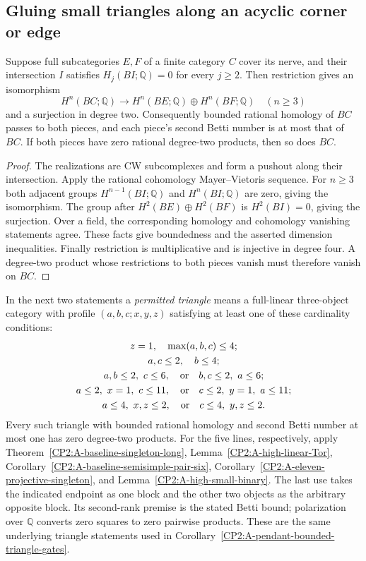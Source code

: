 \subsection{Gluing small triangles along an acyclic corner or edge}

\begin{lemma}
\label{CP2:A-low-homology-gluing}
Suppose full subcategories $E,F$ of a finite category $C$
cover its nerve, and their intersection $I$ satisfies
$H_j(BI;\mathbb Q)=0$ for every $j\geq2$.
Then restriction gives an isomorphism
\[
 H^n(BC;\mathbb Q)\longrightarrow
 H^n(BE;\mathbb Q)\oplus H^n(BF;\mathbb Q)
 \quad(n\geq3)
\]
and a surjection in degree two. Consequently bounded
rational homology of $BC$ passes to both pieces, and
each piece's second Betti number is at most that of $BC$.
If both pieces have zero rational degree-two products,
then so does $BC$.
\end{lemma}
\begin{proof}
The realizations are CW subcomplexes and form a pushout
along their intersection. Apply the rational cohomology
Mayer--Vietoris sequence. For $n\geq3$ both adjacent
groups $H^{n-1}(BI;\mathbb Q)$ and $H^n(BI;\mathbb Q)$
are zero, giving the isomorphism. The group after
$H^2(BE)\oplus H^2(BF)$ is $H^2(BI)=0$, giving the
surjection. Over a field, the corresponding homology
and cohomology vanishing statements agree. These facts
give boundedness and the asserted dimension inequalities.
Finally restriction is multiplicative and is injective
in degree four. A degree-two product whose restrictions
to both pieces vanish must therefore vanish on $BC$.
\end{proof}

In the next two statements a \emph{permitted triangle}
means a full-linear three-object category with profile
$(a,b,c;x,y,z)$ satisfying at least one of these
cardinality conditions:
\[
\begin{gathered}
 z=1,\quad \max(a,b,c)\leq4;\\
 a,c\leq2,\quad b\leq4;\\
 a,b\leq2,\ c\leq6,\quad\hbox{or}\quad b,c\leq2,\ a\leq6;\\
 a\leq2,\ x=1,\ c\leq11,\quad\hbox{or}\quad
 c\leq2,\ y=1,\ a\leq11;\\
 a\leq4,\ x,z\leq2,\quad\hbox{or}\quad
 c\leq4,\ y,z\leq2.
\end{gathered}
\]
Every such triangle with bounded rational homology and
second Betti number at most one has zero degree-two
products. For the five lines, respectively, apply
Theorem~\ref{CP2:A-baseline-singleton-long},
Lemma~\ref{CP2:A-high-linear-Tor},
Corollary~\ref{CP2:A-baseline-semisimple-pair-six},
Corollary~\ref{CP2:A-eleven-projective-singleton}, and
Lemma~\ref{CP2:A-high-small-binary}. The last use takes
the indicated endpoint as one block and the other two
objects as the arbitrary opposite block. Its second-rank
premise is the stated Betti bound; polarization over
$\mathbb Q$ converts zero squares to zero pairwise products.
These are the same underlying triangle statements used
in Corollary~\ref{CP2:A-pendant-bounded-triangle-gates}.


